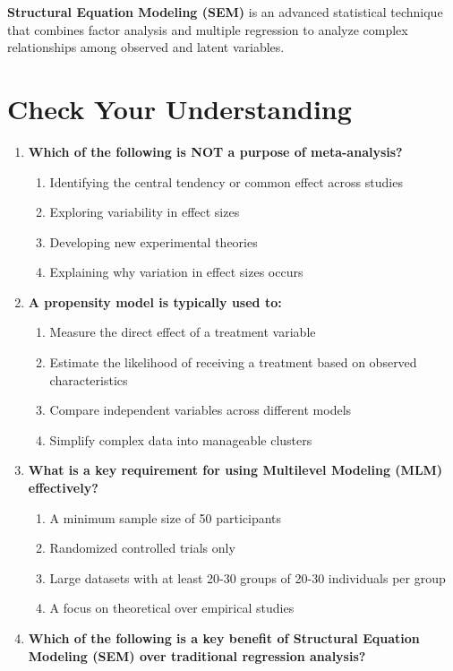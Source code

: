 \documentclass[
  letterpaper,
  DIV=11,
  numbers=noendperiod]{scrreprt}
\begin{document}
\textbf{Structural Equation Modeling (SEM)} is an advanced statistical
technique that combines factor analysis and multiple regression to
analyze complex relationships among observed and latent variables.

\section*{Check Your Understanding}\label{check-your-understanding-13}


\begin{enumerate}
\def\labelenumi{\arabic{enumi}.}
\item
  \textbf{Which of the following is NOT a purpose of meta-analysis?}

  \begin{enumerate}
  \def\labelenumii{\alph{enumii}.}
  \item
    Identifying the central tendency or common effect across studies
  \item
    Exploring variability in effect sizes
  \item
    Developing new experimental theories
  \item
    Explaining why variation in effect sizes occurs
  \end{enumerate}
\item
  \textbf{A propensity model is typically used to:}

  \begin{enumerate}
  \def\labelenumii{\alph{enumii}.}
  \item
    Measure the direct effect of a treatment variable
  \item
    Estimate the likelihood of receiving a treatment based on observed
    characteristics
  \item
    Compare independent variables across different models
  \item
    Simplify complex data into manageable clusters
  \end{enumerate}
\item
  \textbf{What is a key requirement for using Multilevel Modeling (MLM)
  effectively?}

  \begin{enumerate}
  \def\labelenumii{\alph{enumii}.}
  \item
    A minimum sample size of 50 participants
  \item
    Randomized controlled trials only
  \item
    Large datasets with at least 20-30 groups of 20-30 individuals per
    group
  \item
    A focus on theoretical over empirical studies
  \end{enumerate}
\item
  \textbf{Which of the following is a key benefit of Structural Equation
  Modeling (SEM) over traditional regression analysis?}


\end{enumerate}
\end{document}
